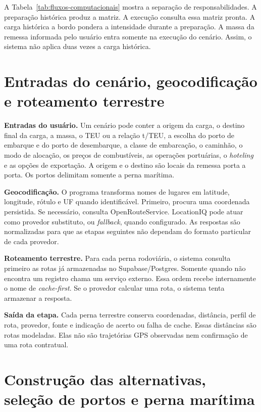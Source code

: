 A Tabela~\ref{tab:fluxos-computacionais} mostra a separação de responsabilidades. A preparação histórica produz a matriz. A execução consulta essa matriz pronta. A carga histórica a bordo pondera a intensidade durante a preparação. A massa da remessa informada pelo usuário entra somente na execução do cenário. Assim, o sistema não aplica duas vezes a carga histórica.

\section{Entradas do cenário, geocodificação e roteamento terrestre}
\label{sec:entradas-geocodificacao-roteamento}

\textbf{Entradas do usuário.} Um cenário pode conter a origem da carga, o destino final da carga, a massa, o TEU ou a relação t/TEU, a escolha do porto de embarque e do porto de desembarque, a classe de embarcação, o caminhão, o modo de alocação, os preços de combustíveis, as operações portuárias, o \emph{hoteling} e as opções de exportação. A origem e o destino são locais da remessa porta a porta. Os portos delimitam somente a perna marítima.

\textbf{Geocodificação.} O programa transforma nomes de lugares em latitude, longitude, rótulo e UF quando identificável. Primeiro, procura uma coordenada persistida. Se necessário, consulta OpenRouteService. LocationIQ pode atuar como provedor substituto, ou \emph{fallback}, quando configurado. As respostas são normalizadas para que as etapas seguintes não dependam do formato particular de cada provedor.

\textbf{Roteamento terrestre.} Para cada perna rodoviária, o sistema consulta primeiro as rotas já armazenadas no Supabase/Postgres. Somente quando não encontra um registro chama um serviço externo. Essa ordem recebe internamente o nome de \emph{cache-first}. Se o provedor calcular uma rota, o sistema tenta armazenar a resposta.

\textbf{Saída da etapa.} Cada perna terrestre conserva coordenadas, distância, perfil de rota, provedor, fonte e indicação de acerto ou falha de cache. Essas distâncias são rotas modeladas. Elas não são trajetórias GPS observadas nem confirmação de uma rota contratual.

\section{Construção das alternativas, seleção de portos e perna marítima}
\label{sec:construcao-alternativas}

